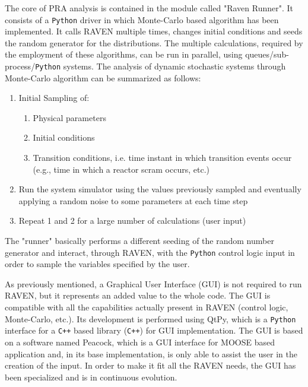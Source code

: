 \documentclass{anstrans}
\begin{document}
The core of PRA analysis is contained in the module called "Raven Runner". It consists of a \verb!Python! driver in which Monte-Carlo based algorithm has been implemented. It calls RAVEN multiple times, changes initial conditions and seeds the random generator for the distributions.
The multiple calculations, required by the employment of these algorithms, can be run in parallel, using queues/sub-process/\verb!Python! systems. The analysis of dynamic stochastic systems through Monte-Carlo algorithm can be summarized as follows:
\begin{enumerate}
\item Initial Sampling of:
       \begin{enumerate}
       \item Physical parameters
       \item Initial conditions
       \item Transition conditions, i.e. time instant in which transition events occur (e.g., time in which a reactor scram occurs, etc.)
    \end{enumerate}
\item Run the system simulator using the values previously sampled and eventually applying a random noise to some parameters at each time step
\item Repeat 1 and 2 for a large number of calculations (user input)
\end{enumerate}
The "runner" basically performs a different seeding of the random number generator and interact, through RAVEN, with the \verb!Python! control logic input in order to sample the variables specified by the user.

As previously mentioned, a Graphical User Interface (GUI) is not required to run RAVEN, but it represents an added value to the whole code. The GUI is compatible with all the capabilities actually present in RAVEN (control logic, Monte-Carlo, etc.).  Its development is performed using QtPy, which is a \verb!Python! interface for a \verb!C++! based library (\verb!C++!) for GUI implementation. The GUI is based on a software named Peacock, which is a GUI interface for MOOSE based application and, in its base implementation, is only able to assist the user in the creation of the input.  In order to make it fit all the RAVEN needs, the GUI has been specialized and is in continuous evolution.
\end{document}
